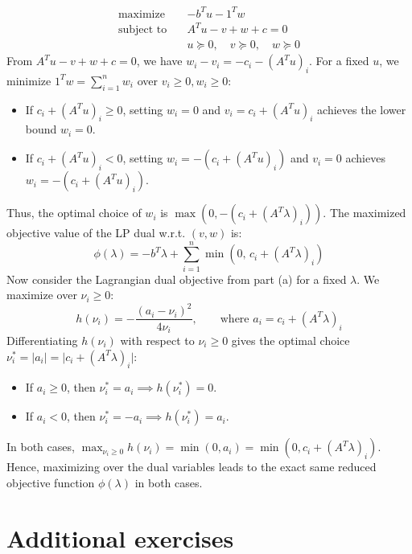 \documentclass{article}
\begin{document}
\begin{itemize}
\begin{itemize}
\begin{itemize}
      \[ \begin{aligned} \text{maximize} \quad & -b^T u - 1^T w \\ \text{subject to} \quad & A^T u - v + w + c = 0 \\ & u \succeq 0, \quad v \succeq 0, \quad w \succeq 0 \end{aligned} \]
      From $A^T u - v + w + c = 0$, we have $w_i - v_i = -c_i - (A^T u)_i$.
      For a fixed $u$, we minimize $1^T w = \sum_{i=1}^n w_i$ over $v_i \ge 0, w_i \ge 0$:
      \begin{itemize}
        \item If $c_i + (A^T u)_i \ge 0$, setting $w_i = 0$ and $v_i = c_i + (A^T u)_i$ achieves the lower bound $w_i = 0$.
        \item If $c_i + (A^T u)_i < 0$, setting $w_i = -(c_i + (A^T u)_i)$ and $v_i = 0$ achieves $w_i = -(c_i + (A^T u)_i)$.
      \end{itemize}
      Thus, the optimal choice of $w_i$ is $\max(0, -(c_i + (A^T \lambda)_i))$.
      The maximized objective value of the LP dual w.r.t. $(v, w)$ is:
      \[ \phi(\lambda) = -b^T \lambda + \sum_{i=1}^n \min\left(0, \, c_i + (A^T \lambda)_i\right) \]
      Now consider the Lagrangian dual objective from part (a) for a fixed $\lambda$. We maximize over $\nu_i \ge 0$:
      \[ h(\nu_i) = -\frac{(a_i - \nu_i)^2}{4\nu_i}, \qquad \text{where } a_i = c_i + (A^T \lambda)_i \]
      Differentiating $h(\nu_i)$ with respect to $\nu_i \ge 0$ gives the optimal choice $\nu_i^* = \vert{}a_i\vert{} = \vert{}c_i + (A^T \lambda)_i\vert{}$:
      \begin{itemize}
        \item If $a_i \ge 0$, then $\nu_i^* = a_i \implies h(\nu_i^*) = 0$.
        \item If $a_i < 0$, then $\nu_i^* = -a_i \implies h(\nu_i^*) = a_i$.
      \end{itemize}
      In both cases, $\max_{\nu_i \ge 0} h(\nu_i) = \min(0, a_i) = \min(0, c_i + (A^T \lambda)_i)$. Hence, maximizing over the dual variables leads to the exact same reduced objective function $\phi(\lambda)$ in both cases.
    \end{itemize}
  \end{itemize}
\end{itemize}

\section{Additional exercises}
\end{document}
